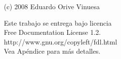 \thispagestyle{empty}
\vspace*{15cm}

\begin{flushright}
(c) 2008 Eduardo Orive Vinuesa


Este trabajo se entrega bajo licencia \\
Free Documentation License 1.2.\\
http://www.gnu.org/copyleft/fdl.html\\

Vea Apéndice para más detalles.
\end{flushright}
